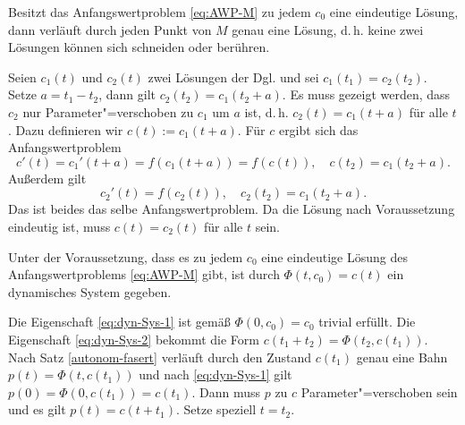 \begin{theorem}\label{autonom-fasert}
Besitzt das Anfangswertproblem \eqref{eq:AWP-M} zu jedem $c_0$ eine
eindeutige Lösung, dann verläuft durch jeden Punkt von $M$ genau
eine Lösung, d.\,h. keine zwei Lösungen können sich schneiden
oder berühren.
\end{theorem}
\noindent{}
Seien $c_1(t)$ und $c_2(t)$ zwei Lösungen der Dgl. und sei
$c_1(t_1)=c_2(t_2)$. Setze $a=t_1-t_2$, dann gilt $c_2(t_2)=c_1(t_2+a)$.
Es muss gezeigt werden, dass $c_2$ nur Parameter"=verschoben
zu $c_1$ um $a$ ist, d.\,h. $c_2(t)=c_1(t+a)$ für alle $t$. Dazu
definieren wir $c(t):=c_1(t+a)$. Für $c$ ergibt sich das
Anfangswertproblem
\begin{equation}
c'(t) = c_1'(t+a) = f(c_1(t+a)) = f(c(t)),\quad c(t_2)=c_1(t_2+a).
\end{equation}
Außerdem gilt
\begin{equation}
c_2'(t) = f(c_2(t)), \quad c_2(t_2)=c_1(t_2+a).
\end{equation}
Das ist beides das selbe Anfangswertproblem. Da die Lösung nach
Voraussetzung eindeutig ist, muss $c(t)=c_2(t)$
für alle $t$ sein.\;\qedsymbol

\begin{theorem}
Unter der Voraussetzung, dass es zu jedem $c_0$ eine eindeutige
Lösung des Anfangswertproblems \eqref{eq:AWP-M} gibt, ist durch
$\Phi(t,c_0)=c(t)$ ein dynamisches System gegeben.
\end{theorem}
\noindent{}
Die Eigenschaft \eqref{eq:dyn-Sys-1} ist gemäß $\Phi(0,c_0)=c_0$
trivial erfüllt. Die Eigenschaft \eqref{eq:dyn-Sys-2} bekommt
die Form $c(t_1+t_2)=\Phi(t_2,c(t_1))$. Nach Satz
\ref{autonom-fasert} verläuft durch den Zustand $c(t_1)$ genau
eine Bahn $p(t)=\Phi(t,c(t_1))$ und nach \eqref{eq:dyn-Sys-1} gilt
$p(0)=\Phi(0,c(t_1))=c(t_1)$. Dann muss $p$ zu $c$ Parameter"=verschoben
sein und es gilt $p(t)=c(t+t_1)$. Setze speziell $t=t_2$.\;\qedsymbol



